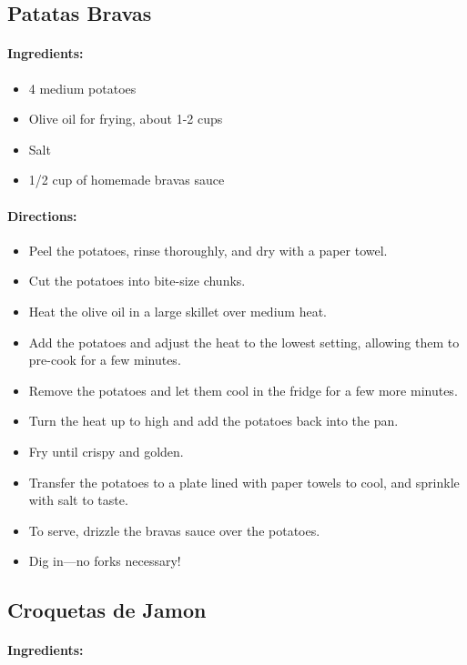 \documentclass{article}
\begin{document}
\subsection{Patatas Bravas}

\paragraph{Ingredients:}

\begin{itemize}
	\item 4 medium potatoes
	\item Olive oil for frying, about 1-2 cups
	\item Salt
	\item 1/2 cup of homemade bravas sauce
\end{itemize}

\paragraph{Directions:}
\begin{itemize}
	\item Peel the potatoes, rinse thoroughly, and dry with a paper towel.
	\item Cut the potatoes into bite-size chunks.
	\item Heat the olive oil in a large skillet over medium heat.
	\item Add the potatoes and adjust the heat to the lowest setting, allowing them to pre-cook for a few minutes.
	\item Remove the potatoes and let them cool in the fridge for a few more minutes.
	\item Turn the heat up to high and add the potatoes back into the pan.
	\item Fry until crispy and golden.
	\item Transfer the potatoes to a plate lined with paper towels to cool, and sprinkle with salt to taste.
	\item To serve, drizzle the bravas sauce over the potatoes.
	\item Dig in—no forks necessary!
\end{itemize}

\subsection{Croquetas de Jamon}

\paragraph{Ingredients:}
\end{document}
